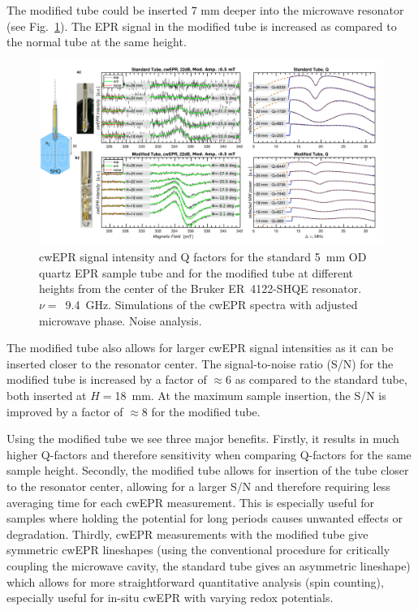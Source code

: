 The modified tube could be inserted 7 mm deeper into the microwave resonator (see Fig.~\ref{fig:S2_Qfactor}). The EPR signal in the modified tube is increased as compared to the normal tube at the same height.

\begin{figure}[h!]
\centering
\includegraphics[width=1\textwidth]{./operando_epr/figures/spins_at_work/Figure_S2.pdf}
\caption{cwEPR signal intensity and Q factors for the standard 5~mm OD quartz EPR sample tube and for the modified tube at different heights from the center of the Bruker ER~4122-SHQE resonator. $\nu=$~9.4~GHz. Simulations of the cwEPR spectra with adjusted microwave phase. Noise analysis.}
\label{fig:S2_Qfactor}
\end{figure}

\par
The modified tube also allows for larger cwEPR signal intensities as it can be inserted closer to the resonator center. The signal-to-noise ratio (S/N) for the modified tube is increased by a factor of $\approx$6 as compared to the standard tube, both inserted at $H=$18~mm. At the maximum sample insertion, the S/N is improved by a factor of $\approx$8 for the modified tube.
\par
Using the modified tube we see three major benefits. Firstly, it results in much higher Q-factors and therefore sensitivity when comparing Q-factors for the same sample height. Secondly, the modified tube allows for insertion of the tube closer to the resonator center, allowing for a larger S/N and therefore requiring less averaging time for each cwEPR measurement. This is especially useful for samples where holding the potential for long periods causes unwanted effects or degradation. Thirdly, cwEPR measurements with the modified tube give symmetric cwEPR lineshapes (using the conventional procedure for critically coupling the microwave cavity, the standard tube gives an asymmetric lineshape) which allows for more straightforward quantitative analysis (spin counting), especially useful for in-situ cwEPR with varying redox potentials.








